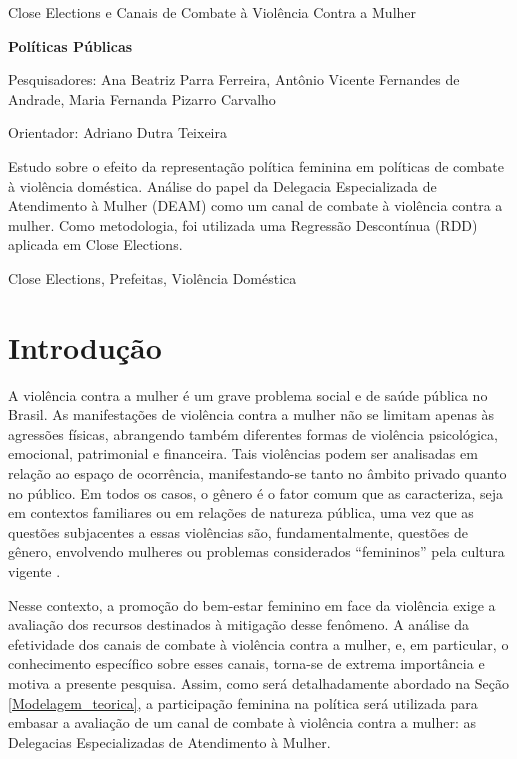 \relatorio
{Close Elections e Canais de Combate à Violência Contra a Mulher}
{

    \noindent \textbf{Políticas Públicas}
    
    \noindent Pesquisadores: Ana Beatriz Parra Ferreira, Antônio Vicente Fernandes de Andrade, Maria Fernanda Pizarro Carvalho
    
    \noindent Orientador: Adriano Dutra Teixeira

}
{

   Estudo sobre o efeito da representação política feminina em políticas de combate à violência doméstica. Análise do papel da Delegacia Especializada de Atendimento à Mulher (DEAM) como um canal de combate à violência contra a mulher. Como metodologia, foi utilizada uma Regressão Descontínua (RDD) aplicada em Close Elections. 

}
{
Close Elections, Prefeitas, Violência Doméstica
}



  
\section{Introdução}
\label{introducao}

A violência contra a mulher é um grave problema social e de saúde pública no Brasil. As manifestações de violência contra a mulher não se limitam apenas às agressões físicas, abrangendo também diferentes formas de violência psicológica, emocional, patrimonial e financeira. Tais violências podem ser analisadas em relação ao espaço de ocorrência, manifestando-se tanto no âmbito privado quanto no público. Em todos os casos, o gênero é o fator comum que as caracteriza, seja em contextos familiares ou em relações de natureza pública, uma vez que as questões subjacentes a essas violências são, fundamentalmente, questões de gênero, envolvendo mulheres ou problemas considerados ``femininos'' pela cultura vigente \cite{schraiber2005violencia}. 



Nesse contexto, a promoção do bem-estar feminino em face da violência exige a avaliação dos recursos destinados à mitigação desse fenômeno. A análise da efetividade dos canais de combate à violência contra a mulher, e, em particular, o conhecimento específico sobre esses canais, torna-se de extrema importância e motiva a presente pesquisa. Assim, como será detalhadamente abordado na Seção \ref{Modelagem_teorica}, a participação feminina na política será utilizada para embasar a avaliação de um canal de combate à violência contra a mulher: as Delegacias Especializadas de Atendimento à Mulher.


